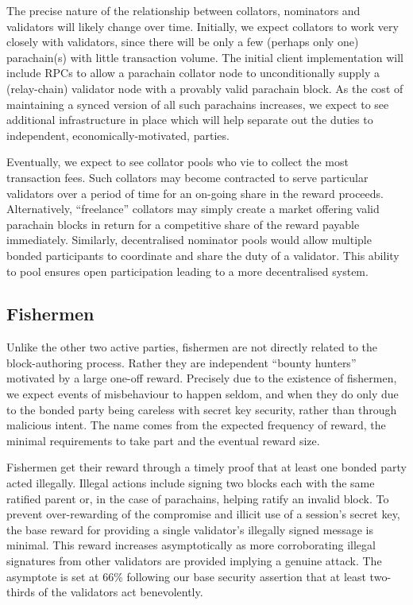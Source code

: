\documentclass[9pt,oneside]{amsart}
\begin{document}
\begin{multicols}{2}
 The precise nature of the relationship between collators, nominators and validators will likely change over time. Initially, we expect collators to work very closely with validators, since there will be only a few (perhaps only one) parachain(s) with little transaction volume. The initial client implementation will include RPCs to allow a parachain collator node to unconditionally supply a (relay-chain) validator node with a provably valid parachain block. As the cost of maintaining a synced version of all such parachains increases, we expect to see additional infrastructure in place which will help separate out the duties to independent, economically-motivated, parties.

 Eventually, we expect to see collator pools who vie to collect the most transaction fees. Such collators may become contracted to serve particular validators over a period of time for an on-going share in the reward proceeds. Alternatively, ``freelance'' collators may simply create a market offering valid parachain blocks in return for a competitive share of the reward payable immediately. Similarly, decentralised nominator pools would allow multiple bonded participants to coordinate and share the duty of a validator. This ability to pool ensures open participation leading to a more decentralised system.

\subsection{Fishermen}
\label{fishermen}

 Unlike the other two active parties, fishermen are not directly related to the block-authoring process. Rather they are independent ``bounty hunters'' motivated by a large one-off reward. Precisely due to the existence of fishermen, we expect events of misbehaviour to happen seldom, and when they do only due to the bonded party being careless with secret key security, rather than through malicious intent. The name comes from the expected frequency of reward, the minimal requirements to take part and the eventual reward size.

 Fishermen get their reward through a timely proof that at least one bonded party acted illegally. Illegal actions include signing two blocks each with the same ratified parent or, in the case of parachains, helping ratify an invalid block. To prevent over-rewarding of the compromise and illicit use of a session's secret key, the base reward for providing a single validator's illegally signed message is minimal. This reward increases asymptotically as more corroborating illegal signatures from other validators are provided implying a genuine attack. The asymptote is set at 66\% following our base security assertion that at least two-thirds of the validators act benevolently.


\end{multicols}
\end{document}
